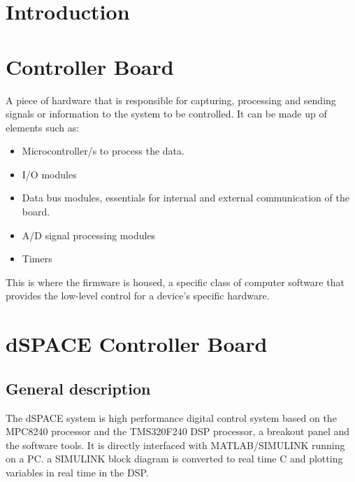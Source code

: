 
\section{Introduction}


\section{Controller Board}
A piece of hardware that is responsible for capturing, processing and sending signals or information to the system to be controlled.
It can be made up of elements such as:
\begin{itemize}
    \item Microcontroller/s to process the data.
    \item I/O modules
    \item Data bus modules, essentials for internal and external communication of the board.
    \item A/D signal processing modules
    \item Timers
\end{itemize}
This is where the firmware is housed, a specific class of computer software that provides the low-level control for a device's specific hardware.



\section{dSPACE Controller Board}
\subsection{General description}
The dSPACE system is high performance digital control system based on the MPC8240 processor and the TMS320F240 DSP processor, a breakout panel and the software tools. It is directly interfaced with MATLAB/SIMULINK running on a PC. a SIMULINK block diagram is converted to real time C and plotting variables in real time in the DSP.

